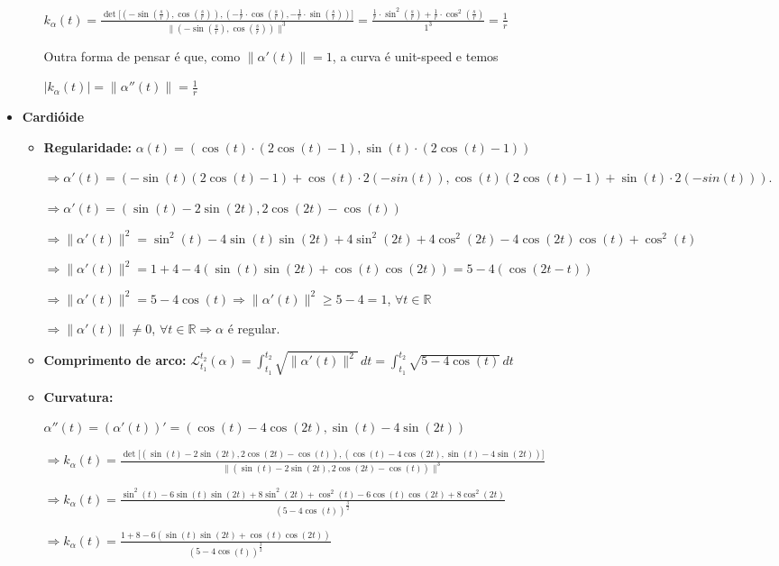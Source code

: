 \documentclass[../main.tex]{subfiles}
\begin{document}
\begin{solucao}
\begin{itemize}
\begin{itemize}
			$k_\alpha(t)=\frac{\det\big[(-\sin(\frac{s}{r}),\cos(\frac{s}{r})), (-\frac{1}{r}\cdot \cos(\frac{s}{r}),-\frac{1}{r}\cdot \sin(\frac{s}{r}))\big]}{\|(-\sin(\frac{s}{r}),\cos(\frac{s}{r}))\|^3}=\frac{\frac{1}{r}\cdot \sin^2(\frac{s}{r})+\frac{1}{r}\cdot \cos^2(\frac{s}{r})}{1^3}=\frac{1}{r}$
			
			Outra forma de pensar é que, como $\|\alpha'(t)\|=1$, a curva é unit-speed e temos
			
			$|k_\alpha(t)|=\|\alpha''(t)\|=\frac{1}{r}$
		\end{itemize}
		\item \textbf{Cardióide}
		\begin{itemize}
			\item \textbf{Regularidade:} $\alpha(t)=(\cos(t)\cdot (2\cos(t)-1),\sin(t)\cdot (2\cos(t)-1))$
			
			$\Rightarrow \alpha'(t)=(-\sin(t)(2\cos(t)-1)+\cos(t)\cdot2(-sin(t)),\cos(t)(2\cos(t)-1)+\sin(t)\cdot 2(-sin(t)))$.
			
			$\Rightarrow \alpha'(t)=(\sin(t)-2\sin(2t), 2\cos(2t)-\cos(t))$
			
			$\Rightarrow \|\alpha'(t)\|^2=\sin^2(t)-4\sin(t)\sin(2t)+4\sin^2(2t)+4\cos^2(2t)-4\cos(2t)\cos(t)+\cos^2(t)$
			
			$\Rightarrow \|\alpha'(t)\|^2=1+4-4(\sin(t)\sin(2t)+\cos(t)\cos(2t))=5-4(\cos(2t-t))$
			
			$\Rightarrow \|\alpha'(t)\|^2=5-4\cos(t)\Rightarrow\|\alpha'(t)\|^2\geq5-4=1$, $\forall t \in \mathbb{R}$
			
			$\Rightarrow \|\alpha'(t)\|\neq 0$, $\forall t \in \mathbb{R}\Rightarrow \alpha$ é regular.
			\item \textbf{Comprimento de arco:}  $\mathcal{L}_{t_1}^{t_2}(\alpha)=\int_{t_1}^{t_2} \sqrt{\|\alpha'(t)\|^2}\, dt=\int_{t_1}^{t_2} \sqrt{5-4\cos(t)}\, dt$
			\item \textbf{Curvatura:}
			
			$\alpha''(t)=(\alpha'(t))'=(\cos(t)-4\cos(2t), \sin(t)- 4\sin(2t))$
			
			{\footnotesize
				$\Rightarrow k_\alpha(t)=
				\tfrac{
					\det\big[(\sin(t)-2\sin(2t), 2\cos(2t)-\cos(t)), (\cos(t)-4\cos(2t), \sin(t)-4\sin(2t))\big]
				}{
					\|(\sin(t)-2\sin(2t), 2\cos(2t)-\cos(t))\|^3
				}$
			}
			
			{\small
				$\Rightarrow k_\alpha(t)=\tfrac{\sin^2(t)-6\sin(t)\sin(2t)+8\sin^2(2t)+\cos^2(t)-6\cos(t)\cos(2t)+8\cos^2(2t)}{(5-4\cos(t))^{\frac{3}{2}}}$
				
				$\Rightarrow k_\alpha(t)=\frac{1+8-6(\sin(t)\sin(2t)+\cos(t)\cos(2t))}{(5-4\cos(t))^{\frac{3}{2}}}$
			}
			

\end{itemize}
\end{itemize}
\end{solucao}
\end{document}
